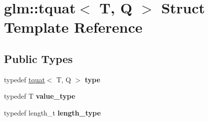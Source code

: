 \hypertarget{structglm_1_1tquat}{}\section{glm\+:\+:tquat$<$ T, Q $>$ Struct Template Reference}
\label{structglm_1_1tquat}
\subsection*{Public Types}
\begin{DoxyCompactItemize}
\item 
\mbox{\label{structglm_1_1tquat_ae9600f57e83d084305f1c801150fbd36}} 
typedef \hyperlink{structglm_1_1tquat}{tquat}$<$ T, Q $>$ {\bfseries type}
\item 
\mbox{\label{structglm_1_1tquat_ac02efd34879e12e77f5143df3708b070}} 
typedef T {\bfseries value\+\_\+type}
\item 
\mbox{\label{structglm_1_1tquat_a6d9ab28781d7835b30216a996484c026}} 
typedef length\+\_\+t {\bfseries length\+\_\+type}
\end{DoxyCompactItemize}
